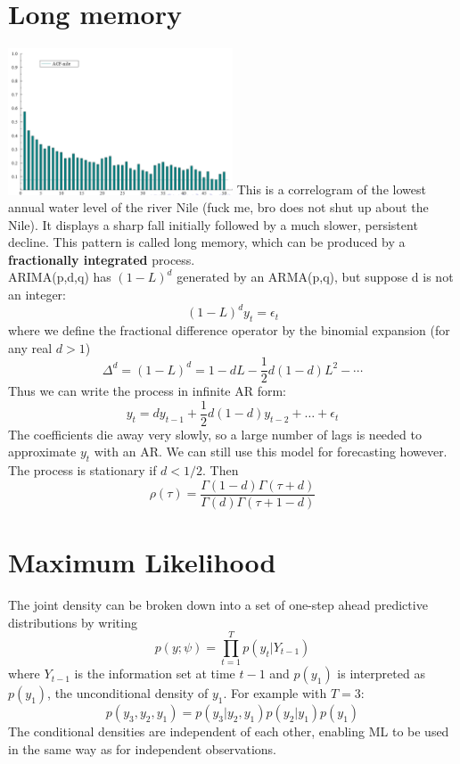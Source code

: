 \documentclass[DIV=14,titlepage=false]{scrreprt}
\begin{document}
\section{Long memory}
    \includegraphics[width=0.5\textwidth]{./Images/Nile-ACF.png}
This is a correlogram of the lowest annual water level of the river Nile (fuck me, bro does not shut up about the Nile). It displays a sharp fall initially followed by a much slower, persistent decline. This pattern is called long memory, which can be produced by a \textbf{fractionally integrated} process.\\
ARIMA(p,d,q) has $(1-L)^d$ generated by an ARMA(p,q), but suppose d is not an integer:
\[
    (1-L)^dy_t = \epsilon_t
\]
where we define the fractional difference operator by the binomial expansion (for any real $d>1$)
\[
    \Delta^d = (1-L)^d = 1-dL-\frac{1}{2}d(1-d)L^2- \cdots
\]
Thus we can write the process in infinite AR form:
\[
    y_t = dy_{t-1} + \frac{1}{2}d(1-d)y_{t-2}+ \dots + \epsilon_t
\]
The coefficients die away very slowly, so a large number of lags is needed to approximate $y_t$ with an AR. We can still use this model for forecasting however.\\
The process is stationary if $d<1/2$. Then
\[
    \rho (\tau) = \frac{\Gamma(1-d)\Gamma(\tau+d)}{\Gamma(d)\Gamma(\tau+1-d)}
\]
\section{Maximum Likelihood}
The joint density can be broken down into a set of one-step ahead predictive distributions by writing 
\[
    p(y;\psi) = \prod_{t=1}^{T}p(y_t|Y_{t-1})
\]
where $Y_{t-1}$ is the information set at time $t-1$ and $p(y_1)$ is interpreted as $p(y_1)$, the unconditional density of $y_1$. For example with $T=3$:
\[
    p(y_3, y_2, y_1) = p(y_3|y_2, y_1)p(y_2|y_1)p(y_1)
\]
The conditional densities are independent of each other, enabling ML to be used in the same way as for independent observations.
\end{document}
